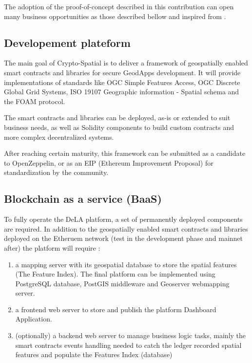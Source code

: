 \documentclass{isprs} %
\begin{document}
The adoption of the proof-of-concept described in this contribution can open many business opportunities as those described bellow and inspired from \cite{business_models}.

\subsection{Developement plateform}\label{sec:Developement plateform}

The main goal of Crypto-Spatial is to deliver a framework of geospatially enabled smart contracts and libraries for secure GeodApps development. It will provide implementations of standards like OGC Simple Features Access, OGC Discrete Global Grid Systems, ISO 19107 Geographic information - Spatial schema \cite{iso2008iso} and the FOAM protocol.

The smart contracts and libraries can be deployed, as-is or extended to suit business needs, as well as Solidity components to build custom contracts and more complex decentralized systems. 

After reaching certain maturity, this framework can be submitted as a candidate to OpenZeppelin, or as an EIP (Ethereum Improvement Proposal) for standardization by the community.

\subsection{Blockchain as a service (BaaS)}\label{sec:Blockchain as a service (BaaS)}

To fully operate the DeLA platform, a set of permanently deployed components are required. In addition to the geospatially enabled smart contracts and libraries deployed on the Etheruem network (test in the development phase and mainnet after) the platform will require : 
\begin{enumerate}
\setlength\itemsep{0em}\setlength\parskip{0em}\setlength\topsep{0em}\setlength\partopsep{0em}\setlength\parsep{0em} 
\item{a mapping server with its geospatial database to store the spatial features (The Feature Index). The final platform can be implemented using PostgreSQL database, PostGIS middleware and Geoserver webmapping server.} 
\item{a frontend web server to store and publish the platform Dashboard Application.}
\item{(optionally) a backend web server to manage business logic tasks, mainly the smart contracts events handling needed to catch the ledger recorded spatial features and populate the Features Index (database)}
\end{enumerate}
\end{document}
